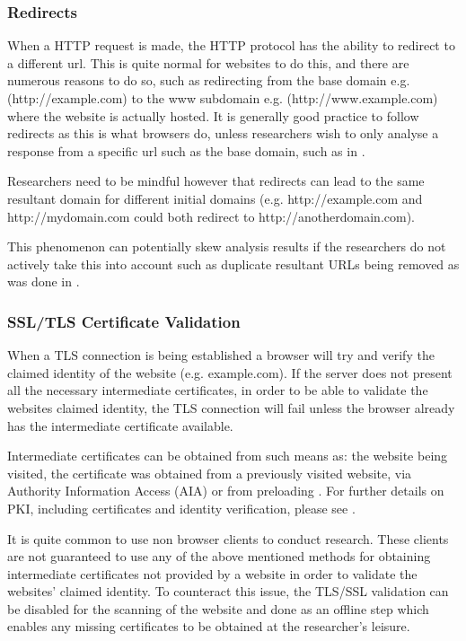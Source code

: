 \documentclass{mscreport}
\begin{document}
\subsubsection{Redirects}

When a HTTP request is made, the HTTP protocol has the ability to redirect to a different url. This is quite normal for websites to do this, and there are numerous reasons to do so, such as redirecting from the base domain e.g. (http://example.com) to the www subdomain e.g. (http://www.example.com) where the website is actually hosted. It is generally good practice to follow redirects as this is what browsers do, unless researchers wish to only analyse a response from a specific url such as the base domain, such as in \cite{Amann2017-co}.

\vspace{0.3cm} \noindent
Researchers need to be mindful however that redirects can lead to the same resultant domain for different initial domains (e.g. http://example.com and http://mydomain.com could both redirect to http://anotherdomain.com).

\vspace{0.3cm} \noindent
This phenomenon can potentially skew analysis results if the researchers do not actively take this into account such as duplicate resultant URLs being removed as was done in \cite{Lavrenovs2018-dl}.

\subsubsection{SSL/TLS Certificate Validation}

When a TLS connection is being established a browser will try and verify the claimed identity of the website (e.g. example.com). If the server does not present all the necessary intermediate certificates, in order to be able to validate the websites claimed identity, the TLS connection will fail unless the browser already has the intermediate certificate available.

\vspace{0.3cm} \noindent
Intermediate certificates can be obtained from such means as: the website being visited, the certificate was obtained from a previously visited website, via Authority Information Access (AIA) \cite{Cooper2008-yr} or from preloading \cite{Keeler2020-yj}. For further details on PKI, including certificates and identity verification, please see \cite{Clark2013-sh,Holz2011-yv}.

\vspace{0.3cm} \noindent
It is quite common to use non browser clients to conduct research. These clients are not guaranteed to use any of the above mentioned methods for obtaining intermediate certificates not provided by a website in order to validate the websites' claimed identity. To counteract this issue, the TLS/SSL validation can be disabled for the scanning of the website and done as an offline step which enables any missing certificates to be obtained at the researcher's leisure.
\end{document}
